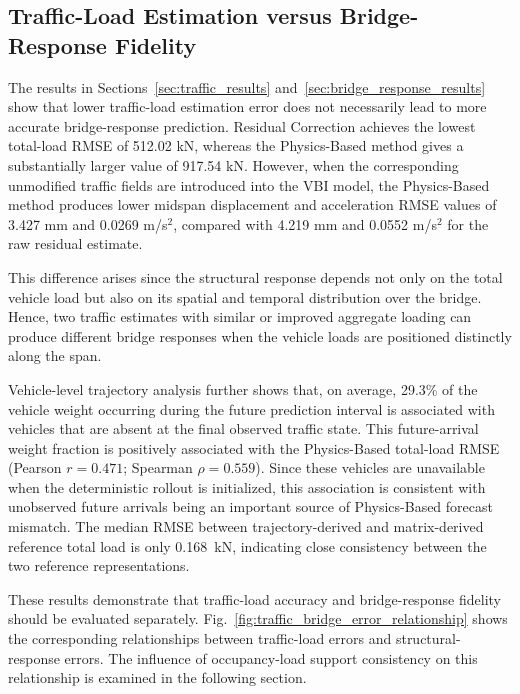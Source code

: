 \documentclass[journal]{IEEEtran}
\begin{document}
\subsection{Traffic-Load Estimation versus Bridge-Response Fidelity}
\label{sec:load_response_fidelity}

The results in Sections~\ref{sec:traffic_results} and~\ref{sec:bridge_response_results} show that lower traffic-load estimation error does not necessarily
lead to more accurate bridge-response prediction. Residual Correction achieves
the lowest total-load RMSE of 512.02 kN, whereas the Physics-Based method gives
a substantially larger value of 917.54 kN. However, when the corresponding
unmodified traffic fields are introduced into the VBI model, the Physics-Based
method produces lower midspan displacement and acceleration RMSE values of
3.427 mm and 0.0269 m/s$^2$, compared with 4.219 mm and 0.0552 m/s$^2$ for the raw
residual estimate.

This difference arises since
the structural response depends not only on the total vehicle load but also on
its spatial and temporal distribution over the bridge. Hence, two traffic
estimates with similar or improved aggregate loading can produce different
bridge responses when the vehicle loads are positioned distinctly along the
span.

Vehicle-level trajectory analysis further shows that, on average, 29.3\% of the vehicle weight occurring during the future prediction interval is associated with vehicles that are absent at the final observed traffic state. This future-arrival weight fraction is positively associated with the Physics-Based total-load RMSE (Pearson $r=0.471$; Spearman $\rho=0.559$). Since these vehicles are unavailable when the deterministic rollout is initialized, this association is consistent with unobserved future arrivals being an important source of Physics-Based forecast mismatch. The median RMSE between trajectory-derived and matrix-derived reference total load is only 0.168~kN, indicating close consistency between the two reference representations.

These results demonstrate that traffic-load accuracy and bridge-response fidelity should be evaluated separately. Fig.~\ref{fig:traffic_bridge_error_relationship} shows the corresponding relationships between traffic-load errors and structural-response errors. The influence of occupancy-load support consistency on this
relationship is examined in the following section.
\end{document}
